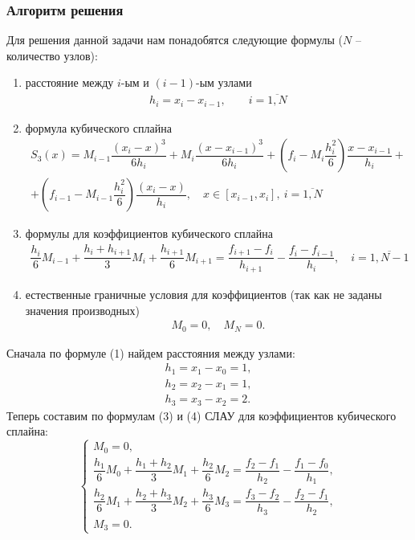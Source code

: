 \documentclass[a4paper, 12pt]{article}
\begin{document}
	\subsubsection*{Алгоритм решения}
	Для решения данной задачи нам понадобятся следующие формулы ($N$ -- количество узлов):\begin{enumerate}
		\item расстояние между $i$-ым и $(i-1)$-ым узлами \begin{eqnarray}
			h_i=x_i - x_{i-1},\qquad i=\overline{1,N}\label{1}
		\end{eqnarray}
		\item формула кубического сплайна\begin{multline}
			S_3(x) = M_{i-1}\dfrac{(x_i - x)^3}{6h_i} + M_{i}\dfrac{(x-x_{i-1})^3}{6h_i} + \left(f_i - M_i\dfrac{h_i^2}{6}\right)\dfrac{x-x_{i-1}}{h_i} +\\+ \left(f_{i-1} - M_{i-1}\dfrac{h_i^2}{6}\right)\dfrac{(x_i - x)}{h_i},\quad x\in [x_{i-1}, x_i],\ i = \overline{1,N}
		\end{multline}
		\item формулы для коэффициентов кубического сплайна
		\begin{multline}
			\dfrac{h_i}{6}M_{i-1} + \dfrac{h_i + h_{i+1}}{3}M_i + \dfrac{h_{i+1}}{6}M_{i+1} = \dfrac{f_{i+1} - f_i}{h_{i+1}} - \dfrac{f_i - f_{i-1}}{h_i},\quad i = \overline {1,N-1}
		\end{multline}
		\item естественные граничные условия для коэффициентов (так как не заданы значения производных) \begin{eqnarray}
			M_0 = 0,\quad M_N = 0.
		\end{eqnarray}
	\end{enumerate}
	Сначала по формуле (1) найдем расстояния между узлами:
	$$\begin{matrix}
		h_1 = x_1 - x_0 = 1,\\
		h_2 = x_2 - x_1 = 1,\\
		h_3 = x_3 - x_2 = 2.
	\end{matrix}$$
	Теперь составим по формулам (3) и (4) СЛАУ для коэффициентов кубического сплайна:
	$$\begin{cases}
		M_0 = 0,\\
		\dfrac{h_1}{6}M_{0} + \dfrac{h_1 + h_{2}}{3}M_1 + \dfrac{h_{2}}{6}M_{2} = \dfrac{f_{2} - f_1}{h_{2}} - \dfrac{f_1 - f_{0}}{h_1},\\
		\dfrac{h_2}{6}M_{1} + \dfrac{h_2 + h_{3}}{3}M_2 + \dfrac{h_{3}}{6}M_{3} = \dfrac{f_{3} - f_2}{h_{3}} - \dfrac{f_2 - f_{1}}{h_2},\\
		M_3 = 0.
	\end{cases}$$
\end{document}
